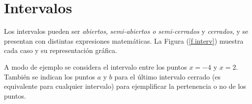 %



\section{Intervalos}
\label{c.interv}

Los intervalos pueden ser \textit{abiertos}, \textit{semi-abiertos o
semi-cerrados} y \textit{cerrados}, y se presentan con distintas expresiones
matemáticas. La Figura (\ref{f.interv}) muestra cada caso y su representación
gráfica.


A modo de ejemplo se considera el intervalo entre los puntos $x=-4$ y $x=2$.
También se indican los puntos $a$ y $b$ para el último intervalo cerrado (es
equivalente para cualquier intervalo) para ejemplificar la pertenencia o no de
los puntos.

